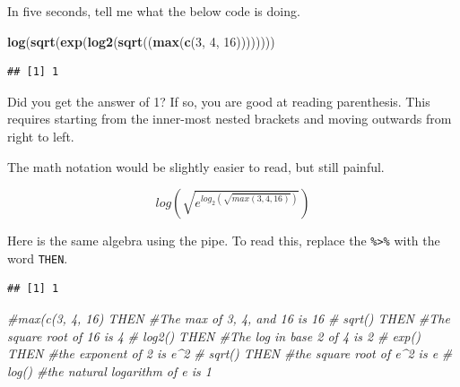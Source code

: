 \documentclass[]{book}
\newenvironment{Shaded}{\begin{snugshade}}{\end{snugshade}}
\newcommand{\CommentTok}[1]{\textcolor[rgb]{0.56,0.35,0.01}{\textit{#1}}}
\newcommand{\DecValTok}[1]{\textcolor[rgb]{0.00,0.00,0.81}{#1}}
\newcommand{\KeywordTok}[1]{\textcolor[rgb]{0.13,0.29,0.53}{\textbf{#1}}}
\newcommand{\NormalTok}[1]{#1}
\newcommand{\OperatorTok}[1]{\textcolor[rgb]{0.81,0.36,0.00}{\textbf{#1}}}
\newcommand{\StringTok}[1]{\textcolor[rgb]{0.31,0.60,0.02}{#1}}
\begin{document}
In five seconds, tell me what the below code is doing.

\begin{Shaded}
\begin{Highlighting}[]
\KeywordTok{log}\NormalTok{(}\KeywordTok{sqrt}\NormalTok{(}\KeywordTok{exp}\NormalTok{(}\KeywordTok{log2}\NormalTok{(}\KeywordTok{sqrt}\NormalTok{((}\KeywordTok{max}\NormalTok{(}\KeywordTok{c}\NormalTok{(}\DecValTok{3}\NormalTok{, }\DecValTok{4}\NormalTok{, }\DecValTok{16}\NormalTok{))))))))}
\end{Highlighting}
\end{Shaded}

\begin{verbatim}
## [1] 1
\end{verbatim}

Did you get the answer of 1? If so, you are good at reading parenthesis. This requires starting from the inner-most nested brackets and moving outwards from right to left.

The math notation would be slightly easier to read, but still painful.

\[log(\sqrt{e^{log_2(\sqrt{max(3,4,16)})}})\]

Here is the same algebra using the pipe. To read this, replace the \texttt{\%\textgreater{}\%} with the word \texttt{THEN}.

\begin{Shaded}
\end{Shaded}

\begin{verbatim}
## [1] 1
\end{verbatim}

\begin{Shaded}
\begin{Highlighting}[]
\CommentTok{#max(c(3, 4, 16) THEN   #The max of 3, 4, and 16 is 16}
\CommentTok{#  sqrt() THEN          #The square root of 16 is 4}
\CommentTok{#  log2() THEN          #The log in base 2 of 4 is 2}
\CommentTok{#  exp() THEN           #the exponent of 2 is e^2}
\CommentTok{#  sqrt() THEN          #the square root of e^2 is e}
\CommentTok{#  log()                #the natural logarithm of e is 1}
\end{Highlighting}
\end{Shaded}
\end{document}

